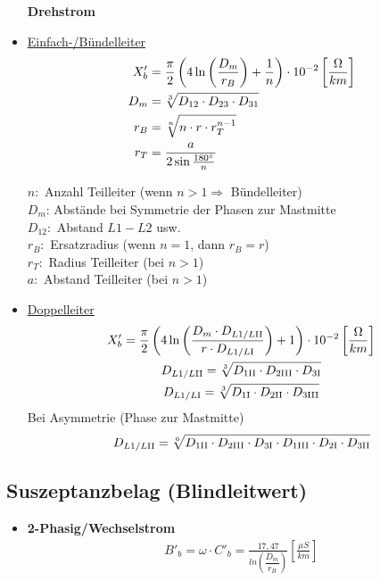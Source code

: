 \begin{itemize}
\textbf{Drehstrom}

    \item[]{\ul{Einfach-/Bündelleiter}}
\begin{align*}
    X_{b}' &= \frac{\pi}{2} \left( 4 \ln \left( \frac{D_{m}}{r_B}\right) +\frac{1}{n} \right) \cdot 10 ^{-2}   \left[\frac{\Omega}{km}\right]\\
    \vspace{5pt}
    D_{m} &= \sqrt[3]{D_{12} \cdot D_{23} \cdot D_{31}}\\
    r_B &= \sqrt[n]{n \cdot r \cdot r_{T}^{n-1}}\\
    r_T &= \frac{a}{2 \sin \frac{180 \degree}{n}}
\end{align*}

$n:$ Anzahl Teilleiter (wenn $n>1 \Rightarrow$ Bündelleiter)\\
$D_m$: Abstände bei Symmetrie der Phasen zur Mastmitte\\
$D_{12}:$ Abstand $L1 - L2$ usw.\\
$r_B:$ Ersatzradius (wenn $n=1$, dann $r_B = r$)\\
$r_T:$ Radius Teilleiter (bei $n>1$)\\
$a:$ Abstand Teilleiter (bei $n>1$)\\



\item[]{\ul{Doppelleiter}}
\begin{gather*}
    X_{b}' = \frac{\pi}{2} \left( 4 \ln \left( \frac{D_{m} \cdot D_{L1/L\RN{2}}}{r \cdot D_{L1/L\RN{1}}}\right) + 1 \right) \cdot 10 ^{-2}   \left[\frac{\Omega}{km}\right]\\
    D_{L1/L\RN{2}} = \sqrt[3]{D_{1\RN{2}} \cdot D_{2\RN{3}} \cdot D_{3\RN{1}}}\\
    D_{L1/L\RN{1}} = \sqrt[3]{D_{1\RN{1}} \cdot D_{2\RN{2}} \cdot D_{3\RN{3}}}
\end{gather*}
Bei Asymmetrie (Phase zur Mastmitte)
\begin{equation*}
    D_{L1/L\RN{2}} = \sqrt[6]{D_{1\RN{2}} \cdot D_{2\RN{3}} \cdot D_{3\RN{1}} \cdot D_{1\RN{3}} \cdot D_{2\RN{1}} \cdot D_{3\RN{2}}}
\end{equation*}
\end{itemize}

\subsection{Suszeptanzbelag (Blindleitwert)}
\begin{itemize}
    \item[]{\textbf{2-Phasig/Wechselstrom}}
    \begin{align*}
        B'_b = \omega \cdot C'_b = \frac{17,47}{ln\left(\dfrac{D_m}{r_B} \right)} \left[ \frac{\mu S}{km} \right]
    \end{align*}
\end{itemize}
\clearpage
